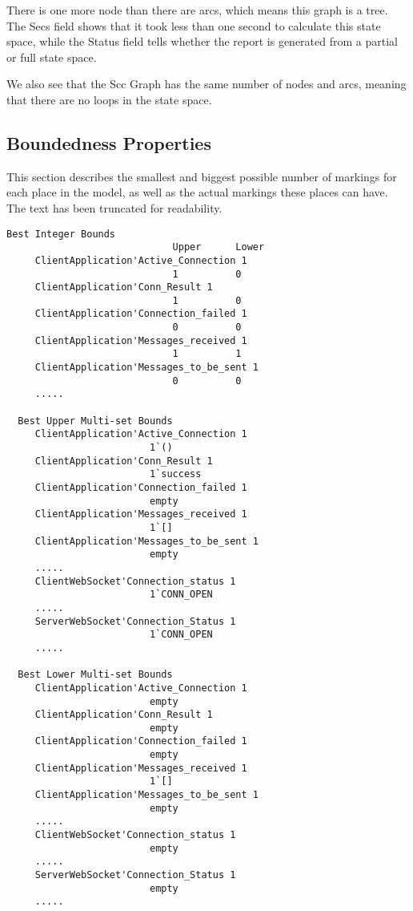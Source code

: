 	There is one more node than there are arcs, which means this graph is a tree. The Secs
	field shows that it took less than one second to calculate this state space,
	while the Status field tells whether the report is generated from a partial or
	full state space.
	
	We also see that the Scc Graph has the same number of nodes and arcs, meaning
	that there are no loops in the state space.
	
	\subsection{Boundedness Properties}
	This section describes the smallest and biggest possible number of markings for
	each place in the model, as well as the actual markings these places can have.
	The text has been truncated for readability.
	\begin{lstlisting}[language={}]
  Best Integer Bounds
                             Upper      Lower
     ClientApplication'Active_Connection 1
                             1          0
     ClientApplication'Conn_Result 1
                             1          0
     ClientApplication'Connection_failed 1
                             0          0
     ClientApplication'Messages_received 1
                             1          1
     ClientApplication'Messages_to_be_sent 1
                             0          0
     .....

  Best Upper Multi-set Bounds
     ClientApplication'Active_Connection 1
                         1`()
     ClientApplication'Conn_Result 1
                         1`success
     ClientApplication'Connection_failed 1
                         empty
     ClientApplication'Messages_received 1
                         1`[]
     ClientApplication'Messages_to_be_sent 1
                         empty
     .....
     ClientWebSocket'Connection_status 1
                         1`CONN_OPEN
     .....
     ServerWebSocket'Connection_Status 1
                         1`CONN_OPEN
     .....

  Best Lower Multi-set Bounds
     ClientApplication'Active_Connection 1
                         empty
     ClientApplication'Conn_Result 1
                         empty
     ClientApplication'Connection_failed 1
                         empty
     ClientApplication'Messages_received 1
                         1`[]
     ClientApplication'Messages_to_be_sent 1
                         empty
     .....
     ClientWebSocket'Connection_status 1
                         empty
     .....
     ServerWebSocket'Connection_Status 1
                         empty
     .....
	\end{lstlisting}
	
